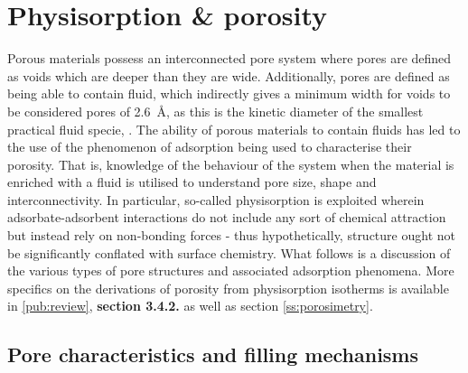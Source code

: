\section{Physisorption \& porosity}
\label{s:adsorption_porosity}
Porous materials possess an interconnected pore system where pores are defined as voids which are deeper than they are wide.\citep{mcnaught1997compendium, Thommes2015Physisorption} Additionally, pores are defined as being able to contain fluid, which indirectly gives a minimum width for voids to be considered pores of \qty{2.6}{\angstrom}, as this is the kinetic diameter of the smallest practical fluid specie, .\citep{Thommes2015Physisorption, Lide2007Handbook} The ability of porous materials to contain fluids has led to the use of the phenomenon of adsorption being used to characterise their porosity. That is, knowledge of the behaviour of the system when the material is enriched with a fluid is utilised to understand pore size, shape and interconnectivity. In particular, so-called \gls{physisorption} is exploited wherein \gls{adsorbate}-\gls{adsorbent} interactions do not include any sort of chemical attraction but instead rely on non-bonding forces\citep{Thommes2015Physisorption} - thus hypothetically, structure ought not be significantly conflated with surface chemistry. What follows is a discussion of the various types of pore structures and associated adsorption phenomena. More specifics on the derivations of porosity from \gls{physisorption} isotherms is available in \ref{pub:review}, \textbf{section 3.4.2.} as well as section \ref{ss:porosimetry}.


\subsection{Pore characteristics and filling mechanisms}
\label{ss:pore_filling}

